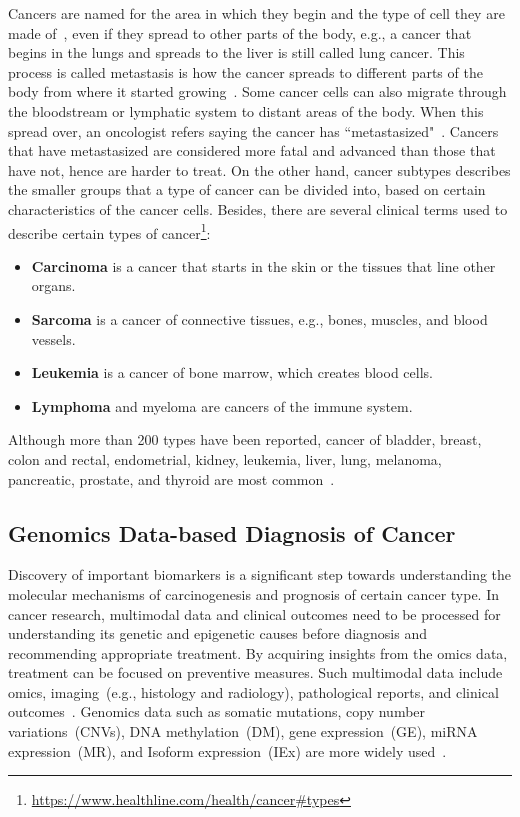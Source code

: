 \hspace*{3.5mm} Cancers are named for the area in which they begin and the type of cell they are made of~\cite{19Cruz}, even if they spread to other parts of the body, e.g., a cancer that begins in the lungs and spreads to the liver is still called lung cancer. This process is called metastasis is how the cancer spreads to different parts of the body from where it started growing~\cite{13cancerdef}. Some cancer cells can also migrate through the bloodstream or lymphatic system to distant areas of the body. When this spread over, an oncologist refers saying the cancer has ``metastasized"~\cite{22Ding}. Cancers that have metastasized are considered more fatal and advanced than those that have not, hence are harder to treat. On the other hand, cancer subtypes describes the smaller groups that a type of cancer can be divided into, based on certain characteristics of the cancer cells. Besides, there are several clinical terms used to describe certain types of cancer\footnote{\url{https://www.healthline.com/health/cancer\#types}}:

\begin{itemize}[noitemsep]
    \item \textbf{Carcinoma} is a cancer that starts in the skin or the tissues that line other organs.
    \item \textbf{Sarcoma} is a cancer of connective tissues, e.g., bones, muscles, and blood vessels.
    \item \textbf{Leukemia} is a cancer of bone marrow, which creates blood cells.
    \item \textbf{Lymphoma} and myeloma are cancers of the immune system.
\end{itemize} 

\hspace*{3.5mm} Although more than 200 types have been reported, cancer of bladder, breast, colon and rectal, endometrial, kidney, leukemia, liver, lung, melanoma, pancreatic, prostate, and thyroid are most common~\cite{71Torre}. 

\subsection{Genomics Data-based Diagnosis of Cancer}
Discovery of important biomarkers is a significant step towards understanding the molecular mechanisms of carcinogenesis and prognosis of certain cancer type. In cancer research, multimodal data and clinical outcomes need to be processed for understanding its genetic and epigenetic causes before diagnosis and recommending appropriate treatment. By acquiring insights from the omics data, treatment can be focused on preventive measures. Such multimodal data include omics, imaging~(e.g., histology and radiology), pathological reports, and clinical outcomes~\cite{22Ding, 23Zheng}. Genomics data such as somatic mutations, copy number variations~(CNVs), DNA methylation~(DM), gene expression~(GE), miRNA expression~(MR), and Isoform expression~(IEx) are more widely used~\cite{yates, ncbi1,ncbi2, kozomara1,kozomara2}.  

